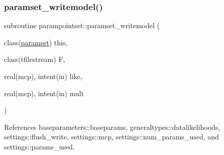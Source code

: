 \subsubsection{\texorpdfstring{paramset\+\_\+writemodel()}{paramset\_writemodel()}}
{\footnotesize\ttfamily subroutine parampointset\+::paramset\+\_\+writemodel (\begin{DoxyParamCaption}\item[{class(\mbox{\hyperlink{structparampointset_1_1paramset}{paramset}})}]{this,  }\item[{class(tfilestream)}]{F,  }\item[{real(mcp), intent(in)}]{like,  }\item[{real(mcp), intent(in)}]{mult }\end{DoxyParamCaption})}



References baseparameters\+::baseparams, generaltypes\+::datalikelihoods, settings\+::flush\+\_\+write, settings\+::mcp, settings\+::num\+\_\+params\+\_\+used, and settings\+::params\+\_\+used.


